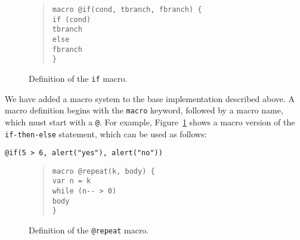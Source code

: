 \begin{figure}[tp]
\begin{quote}
\hspace*{0mm}\verb+macro @if(cond, tbranch, fbranch) {+\\
\hspace*{5mm}\verb+if (cond)+\\
\hspace*{10mm}\verb+tbranch+\\
\hspace*{5mm}\verb+else+\\
\hspace*{10mm}\verb+fbranch+\\
\hspace*{0mm}\verb+}+\\
\end{quote}
\caption{Definition of the {\tt if} macro.}
\label{fig:macro if}
\end{figure}

We have added a macro system to the base implementation described above.
A macro definition begins with the {\tt macro} keyword, followed by a macro name,
which must start with a {\tt @}.
For example, Figure~\ref{fig:macro if} shows a macro version of the {\tt if-then-else} statement,
which can be used as follows:

\smallskip
\noindent\verb+@if(5 > 6, alert("yes"), alert("no"))+
\smallskip

\begin{figure}[tp]
\begin{quote}
\hspace*{0mm}\verb+macro @repeat(k, body) {+\\
\hspace*{5mm}\verb+var n = k+\\
\hspace*{5mm}\verb+while (n-- > 0)+\\
\hspace*{10mm}\verb+body+\\
\hspace*{0mm}\verb+}+\\
\end{quote}
\caption{Definition of the {\tt @repeat} macro.}
\label{fig:macro repeat}
\end{figure}


